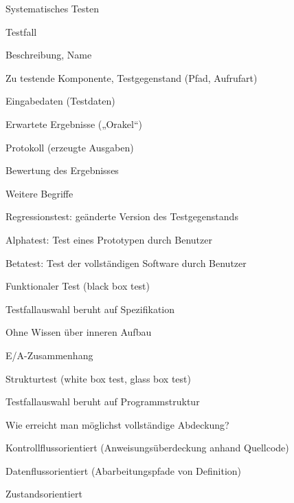 \documentclass[a4paper]{article}
\begin{document}
\begin{multicols}{3}
  Systematisches Testen
  \begin{itemize*}
    \item Testfall
    \begin{itemize*}
      \item Beschreibung, Name
      \item Zu testende Komponente, Testgegenstand (Pfad, Aufrufart)
      \item Eingabedaten (Testdaten)
      \item Erwartete Ergebnisse („Orakel“)
      \item Protokoll (erzeugte Ausgaben)
      \item Bewertung des Ergebnisses
    \end{itemize*}
    \item Weitere Begriffe
    \begin{itemize*}
      \item Regressionstest: geänderte Version des Testgegenstands
      \item Alphatest: Test eines Prototypen durch Benutzer
      \item Betatest: Test der vollständigen Software durch Benutzer
    \end{itemize*}
  \end{itemize*}

  Funktionaler Test (black box test)
  \begin{itemize*}
    \item Testfallauswahl beruht auf Spezifikation
    \item Ohne Wissen über inneren Aufbau
    \item E/A-Zusammenhang
  \end{itemize*}

  Strukturtest (white box test, glass box test)
  \begin{itemize*}
    \item Testfallauswahl beruht auf Programmstruktur
    \item Wie erreicht man möglichst vollständige Abdeckung?
    \item Kontrollflussorientiert (Anweisungsüberdeckung anhand Quellcode)
    \item Datenflussorientiert (Abarbeitungspfade von Definition)
    \item Zustandsorientiert
  \end{itemize*}


\end{multicols}
\end{document}
